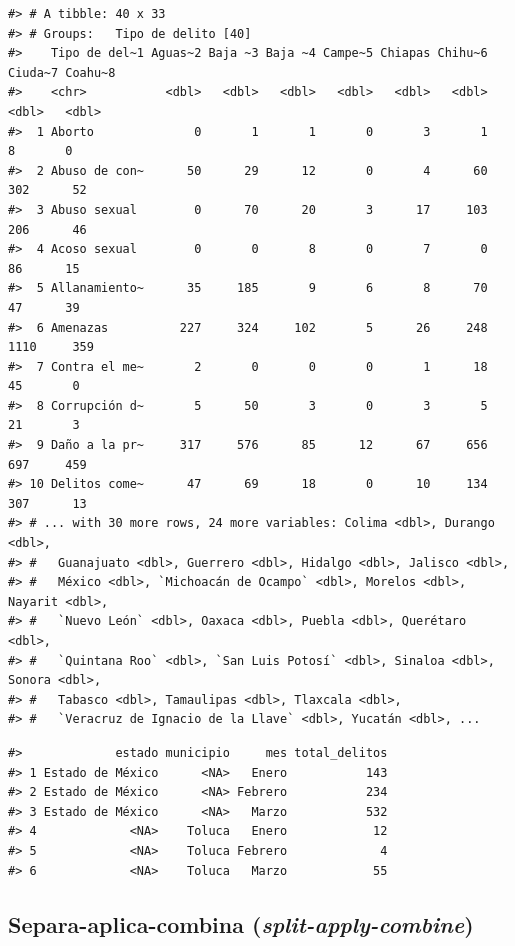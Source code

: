 \documentclass[
]{book}
\begin{document}
\begin{verbatim}
#> # A tibble: 40 x 33
#> # Groups:   Tipo de delito [40]
#>    Tipo de del~1 Aguas~2 Baja ~3 Baja ~4 Campe~5 Chiapas Chihu~6 Ciuda~7 Coahu~8
#>    <chr>           <dbl>   <dbl>   <dbl>   <dbl>   <dbl>   <dbl>   <dbl>   <dbl>
#>  1 Aborto              0       1       1       0       3       1       8       0
#>  2 Abuso de con~      50      29      12       0       4      60     302      52
#>  3 Abuso sexual        0      70      20       3      17     103     206      46
#>  4 Acoso sexual        0       0       8       0       7       0      86      15
#>  5 Allanamiento~      35     185       9       6       8      70      47      39
#>  6 Amenazas          227     324     102       5      26     248    1110     359
#>  7 Contra el me~       2       0       0       0       1      18      45       0
#>  8 Corrupción d~       5      50       3       0       3       5      21       3
#>  9 Daño a la pr~     317     576      85      12      67     656     697     459
#> 10 Delitos come~      47      69      18       0      10     134     307      13
#> # ... with 30 more rows, 24 more variables: Colima <dbl>, Durango <dbl>,
#> #   Guanajuato <dbl>, Guerrero <dbl>, Hidalgo <dbl>, Jalisco <dbl>,
#> #   México <dbl>, `Michoacán de Ocampo` <dbl>, Morelos <dbl>, Nayarit <dbl>,
#> #   `Nuevo León` <dbl>, Oaxaca <dbl>, Puebla <dbl>, Querétaro <dbl>,
#> #   `Quintana Roo` <dbl>, `San Luis Potosí` <dbl>, Sinaloa <dbl>, Sonora <dbl>,
#> #   Tabasco <dbl>, Tamaulipas <dbl>, Tlaxcala <dbl>,
#> #   `Veracruz de Ignacio de la Llave` <dbl>, Yucatán <dbl>, ...
\end{verbatim}

\begin{verbatim}
#>             estado municipio     mes total_delitos
#> 1 Estado de México      <NA>   Enero           143
#> 2 Estado de México      <NA> Febrero           234
#> 3 Estado de México      <NA>   Marzo           532
#> 4             <NA>    Toluca   Enero            12
#> 5             <NA>    Toluca Febrero             4
#> 6             <NA>    Toluca   Marzo            55
\end{verbatim}

\hypertarget{separa-aplica-combina-split-apply-combine}{%
\subsection*{\texorpdfstring{Separa-aplica-combina (\emph{split-apply-combine})}{Separa-aplica-combina (split-apply-combine)}}\label{separa-aplica-combina-split-apply-combine}}
\end{document}
